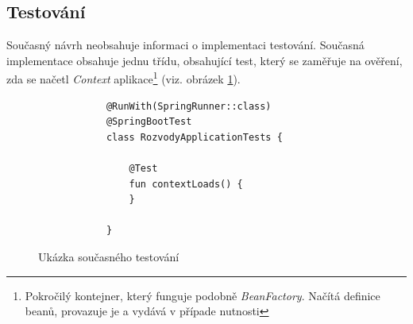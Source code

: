     \subsection{Testování}
        Současný návrh neobsahuje informaci o implementaci testování. Současná implementace obsahuje jednu třídu, obsahující test, který se zaměřuje na ověření, zda se načetl {\textit{Context} aplikace}\footnote{Pokročilý kontejner, který funguje podobně \textit{BeanFactory}. Načítá definice beanů, provazuje je a vydává v případe nutnosti} (viz. obrázek \ref{code:test-context-loads1}).
        \begin{figure}
            \begin{verbatim}
            @RunWith(SpringRunner::class)
            @SpringBootTest
            class RozvodyApplicationTests {

                @Test
                fun contextLoads() {
                }

            }
            \end{verbatim}
            \caption{Ukázka současného testování} 
            \label{code:test-context-loads1}
        \end{figure}